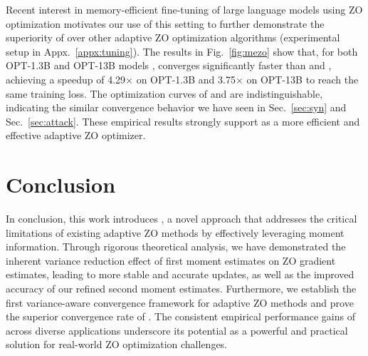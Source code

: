 Recent interest in memory-efficient fine-tuning of large language models using ZO optimization \citep{mezo, revisit-mezo} motivates our use of this setting to further demonstrate the superiority of \ours{} over other adaptive ZO optimization algorithms (experimental setup in Appx.~\ref{appx:tuning}). The results in Fig.~\ref{fig:mezo} show that, for both OPT-1.3B and OPT-13B models \citep{zhang2022opt}, \ours{} converges significantly faster than \rms{} and \base{}, achieving a speedup of 4.29$\times$ on OPT-1.3B and 3.75$\times$ on OPT-13B to reach the same training loss. The optimization curves of \rms{} and \base{} are indistinguishable, indicating the similar convergence behavior we have seen in Sec.~\ref{sec:syn} and Sec.~\ref{sec:attack}. These empirical results strongly support \ours{} as a more efficient and effective adaptive ZO optimizer.

\section{Conclusion}
In conclusion, this work introduces \ours{}, a novel approach that addresses the critical limitations of existing adaptive ZO methods by effectively leveraging moment information. Through rigorous theoretical analysis, we have demonstrated the inherent variance reduction effect of first moment estimates on ZO gradient estimates, leading to more stable and accurate updates, as well as the improved accuracy of our refined second moment estimates. Furthermore, we establish the first variance-aware convergence framework for adaptive ZO methods and prove the superior convergence rate of \ours{}. The consistent empirical performance gains of \ours{} across diverse applications underscore its potential as a powerful and practical solution for real-world ZO optimization challenges. 

